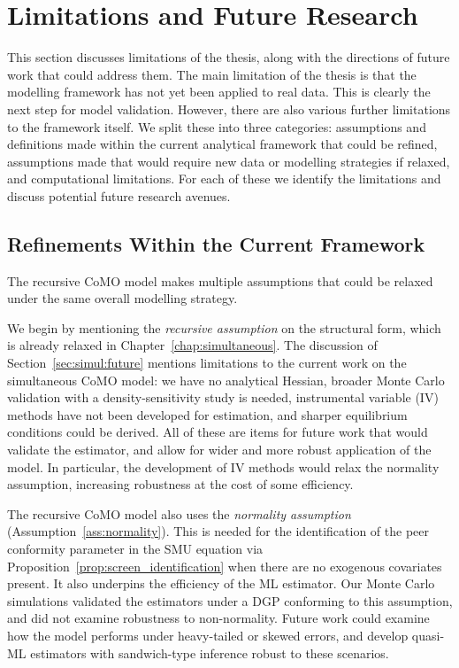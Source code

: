 \section{Limitations and Future Research}
\label{sec:discussion_conclusion:limitations_future}
This section discusses limitations of the thesis, along with the directions of future work that could address them. The main limitation of the thesis is that the modelling framework has not yet been applied to real data. This is clearly the next step for model validation. However, there are also various further limitations to the framework itself. We split these into three categories: assumptions and definitions made within the current analytical framework that could be refined, assumptions made that would require new data or modelling strategies if relaxed, and computational limitations. For each of these we identify the limitations and discuss potential future research avenues.

\subsection{Refinements Within the Current Framework}

The recursive CoMO model makes multiple assumptions that could be relaxed under the same overall modelling strategy.

We begin by mentioning the \emph{recursive assumption} on the structural form, which is already relaxed in Chapter~\ref{chap:simultaneous}. The discussion of Section~\ref{sec:simul:future} mentions limitations to the current work on the simultaneous CoMO model: we have no analytical Hessian, broader Monte Carlo validation with a density-sensitivity study is needed, instrumental variable (IV) methods have not been developed for estimation, and sharper equilibrium conditions could be derived. All of these are items for future work that would validate the estimator, and allow for wider and more robust application of the model. In particular, the development of IV methods would relax the normality assumption, increasing robustness at the cost of some efficiency.

The recursive CoMO model also uses the \emph{normality assumption} (Assumption~\ref{ass:normality}). This is needed for the identification of the peer conformity parameter in the SMU equation via Proposition~\ref{prop:screen_identification} when there are no exogenous covariates present. It also underpins the efficiency of the ML estimator. Our Monte Carlo simulations validated the estimators under a DGP conforming to this assumption, and did not examine robustness to non-normality. Future work could examine how the model performs under heavy-tailed or skewed errors, and develop quasi-ML estimators with sandwich-type inference robust to these scenarios.

